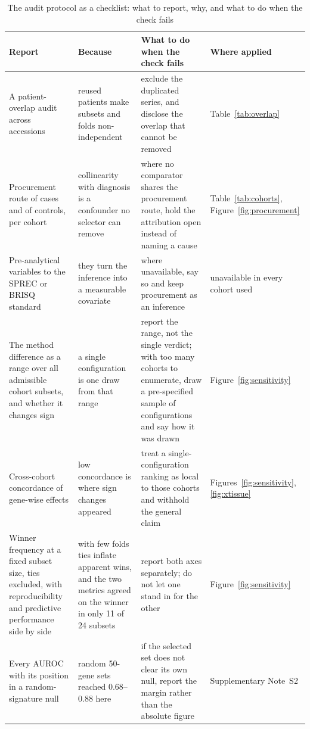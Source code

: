 \documentclass[unnumsec,webpdf,contemporary,large,numbered]{oup-authoring-template}
\begin{document}
\begin{table}[!t]
\caption{The audit protocol as a checklist: what to report, why, and what to do when the check fails}\label{tab:checklist}
\tabcolsep=0pt
\begin{tabular*}{\textwidth}{@{\extracolsep\fill}>{\raggedright\arraybackslash}p{40mm}>{\raggedright\arraybackslash}p{44mm}>{\raggedright\arraybackslash}p{58mm}>{\raggedright\arraybackslash}p{28mm}@{\extracolsep\fill}}
\toprule
Report & Because & What to do when the check fails & Where applied \\
\midrule
A patient-overlap audit across accessions & reused patients make subsets and folds non-independent & exclude the duplicated series, and disclose the overlap that cannot be removed & Table~\ref{tab:overlap} \\
Procurement route of cases and of controls, per cohort & collinearity with diagnosis is a confounder no selector can remove & where no comparator shares the procurement route, hold the attribution open instead of naming a cause & Table~\ref{tab:cohorts}, Figure~\ref{fig:procurement} \\
Pre-analytical variables to the SPREC or BRISQ standard & they turn the inference into a measurable covariate & where unavailable, say so and keep procurement as an inference & unavailable in every cohort used \\
The method difference as a range over all admissible cohort subsets, and whether it changes sign & a single configuration is one draw from that range & report the range, not the single verdict; with too many cohorts to enumerate, draw a pre-specified sample of configurations and say how it was drawn & Figure~\ref{fig:sensitivity} \\
Cross-cohort concordance of gene-wise effects & low concordance is where sign changes appeared & treat a single-configuration ranking as local to those cohorts and withhold the general claim & Figures~\ref{fig:sensitivity}, \ref{fig:xtissue} \\
Winner frequency at a fixed subset size, ties excluded, with reproducibility and predictive performance side by side & with few folds ties inflate apparent wins, and the two metrics agreed on the winner in only 11 of 24 subsets & report both axes separately; do not let one stand in for the other & Figure~\ref{fig:sensitivity} \\
Every AUROC with its position in a random-signature null & random 50-gene sets reached 0.68--0.88 here & if the selected set does not clear its own null, report the margin rather than the absolute figure & Supplementary Note~S2 \\

\end{tabular*}
\end{table}
\end{document}
